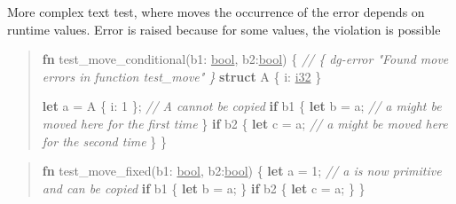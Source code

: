 \documentclass[
  11pt,
  twoside]{report}
\newenvironment{Shaded}{}{}
\newcommand{\CommentTok}[1]{\textit{#1}}
\newcommand{\ControlFlowTok}[1]{\textbf{#1}}
\newcommand{\DataTypeTok}[1]{\underline{#1}}
\newcommand{\DecValTok}[1]{#1}
\newcommand{\KeywordTok}[1]{\textbf{#1}}
\newcommand{\NormalTok}[1]{#1}
\newcommand{\OperatorTok}[1]{#1}
\begin{document}
More complex text test, where moves the occurrence of the error depends
on runtime values. Error is raised because for some values, the
violation is possible

\begin{quote}
\begin{Shaded}
\begin{Highlighting}[]
\KeywordTok{fn}\NormalTok{ test\_move\_conditional(b1}\OperatorTok{:} \DataTypeTok{bool}\OperatorTok{,}\NormalTok{ b2}\OperatorTok{:}\DataTypeTok{bool}\NormalTok{) }\OperatorTok{\{}
     \CommentTok{// \{ dg{-}error "Found move errors in function test\_move" \}}
    \KeywordTok{struct}\NormalTok{ A }\OperatorTok{\{}\NormalTok{ i}\OperatorTok{:} \DataTypeTok{i32} \OperatorTok{\}}

    \KeywordTok{let}\NormalTok{ a }\OperatorTok{=}\NormalTok{ A }\OperatorTok{\{}\NormalTok{ i}\OperatorTok{:} \DecValTok{1} \OperatorTok{\};} \CommentTok{// \textasciigrave{}A\textasciigrave{} cannot be copied}
    \ControlFlowTok{if}\NormalTok{ b1 }\OperatorTok{\{}
        \KeywordTok{let}\NormalTok{ b }\OperatorTok{=}\NormalTok{ a}\OperatorTok{;} \CommentTok{// \textasciigrave{}a\textasciigrave{} might be moved here for the first time}
    \OperatorTok{\}}
    \ControlFlowTok{if}\NormalTok{ b2 }\OperatorTok{\{}
        \KeywordTok{let}\NormalTok{ c }\OperatorTok{=}\NormalTok{ a}\OperatorTok{;} \CommentTok{// \textasciigrave{}a\textasciigrave{} might be moved here for the second time}
    \OperatorTok{\}}
\OperatorTok{\}}
\end{Highlighting}
\end{Shaded}
\end{quote}

\begin{quote}
\begin{Shaded}
\begin{Highlighting}[]
\KeywordTok{fn}\NormalTok{ test\_move\_fixed(b1}\OperatorTok{:} \DataTypeTok{bool}\OperatorTok{,}\NormalTok{ b2}\OperatorTok{:}\DataTypeTok{bool}\NormalTok{) }\OperatorTok{\{}
    \KeywordTok{let}\NormalTok{ a }\OperatorTok{=} \DecValTok{1}\OperatorTok{;} \CommentTok{// a is now primitive and can be copied}
    \ControlFlowTok{if}\NormalTok{ b1 }\OperatorTok{\{}
        \KeywordTok{let}\NormalTok{ b }\OperatorTok{=}\NormalTok{ a}\OperatorTok{;}
    \OperatorTok{\}}
    \ControlFlowTok{if}\NormalTok{ b2 }\OperatorTok{\{}
        \KeywordTok{let}\NormalTok{ c }\OperatorTok{=}\NormalTok{ a}\OperatorTok{;}
    \OperatorTok{\}}
\OperatorTok{\}}
\end{Highlighting}
\end{Shaded}
\end{quote}
\end{document}
